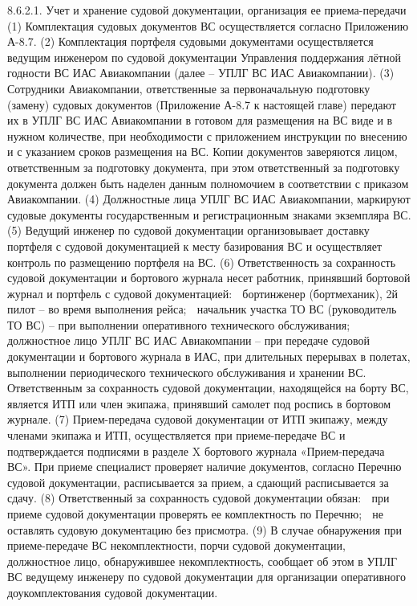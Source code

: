 8.6.2.1. Учет и хранение судовой документации, организация ее приема-передачи 
(1) Комплектация судовых документов ВС осуществляется согласно Приложению А-8.7.
(2) Комплектация портфеля судовыми документами осуществляется ведущим инженером по судовой документации Управления поддержания лётной годности ВС ИАС Авиакомпании (далее – УПЛГ ВС ИАС Авиакомпании). 
(3) Сотрудники Авиакомпании, ответственные за первоначальную подготовку (замену) судовых документов (Приложение А-8.7 к настоящей главе) передают их в УПЛГ ВС ИАС Авиакомпании в готовом для размещения на ВС виде и в нужном количестве, при необходимости с приложением инструкции по внесению и с указанием сроков размещения на ВС.
Копии документов заверяются лицом, ответственным за подготовку документа, при этом ответственный за подготовку документа должен быть наделен данным полномочием в соответствии с приказом Авиакомпании. 
(4) Должностные лица УПЛГ ВС ИАС Авиакомпании, маркируют судовые документы государственным и регистрационным знаками экземпляра ВС. 
(5) Ведущий инженер по судовой документации организовывает доставку портфеля с судовой документацией к месту базирования ВС и осуществляет контроль по размещению портфеля на ВС.
(6) Ответственность за сохранность судовой документации и бортового журнала несет работник, принявший бортовой журнал и портфель с судовой документацией:
	бортинженер (бортмеханик), 2й пилот – во время выполнения рейса;
	начальник участка ТО ВС (руководитель ТО ВС) – при выполнении оперативного технического обслуживания;
	должностное лицо УПЛГ ВС ИАС Авиакомпании – при передаче судовой документации и бортового журнала в ИАС, при длительных перерывах в полетах, выполнении периодического технического обслуживания и хранении ВС.
Ответственным за сохранность судовой документации, находящейся на борту ВС, является ИТП или член экипажа, принявший самолет под роспись в бортовом журнале. 
(7) Прием-передача судовой документации от ИТП экипажу, между членами экипажа и ИТП, осуществляется при приеме-передаче ВС и подтверждается подписями в разделе X бортового журнала «Прием-передача ВС».
При приеме специалист проверяет наличие документов, согласно Перечню судовой документации, расписывается за прием, а сдающий расписывается за сдачу. 
(8) Ответственный за сохранность судовой документации обязан:
	при приеме судовой документации проверять ее комплектность по Перечню;
	не оставлять судовую документацию без присмотра.
(9) В случае обнаружения при приеме-передаче ВС некомплектности, порчи судовой документации, должностное лицо, обнаружившее некомплектность, сообщает об этом в УПЛГ ВС ведущему инженеру по судовой документации для организации оперативного доукомплектования судовой документации. 

